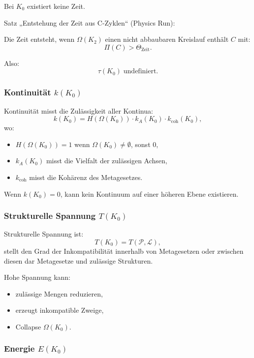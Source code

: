 Bei $K_0$ existiert keine Zeit.

Satz „Entstehung der Zeit aus C-Zyklen“ (Physics Run):

Die Zeit entsteht, wenn $\Omega(K_2)$ einen nicht abbaubaren Kreislauf enthält
$C$ mit:
\[
\Pi(C) > \Theta_{\mathrm{Zeit}}.
\]

Also:
\[
\tau(K_0) \;\text{undefiniert}.
\]

\subsubsection{Kontinuität \texorpdfstring{$k(K_0)$}{k(K_0)}}

Kontinuität misst die Zulässigkeit aller Kontinua:
\[
k(K_0) =
H(\Omega(K_0)) \cdot
k_A(K_0) \cdot
k_{\mathrm{coh}}(K_0),
\]
wo:
\begin{itemize}
    \item $H(\Omega(K_0)) = 1$ wenn $\Omega(K_0)\neq\emptyset$, sonst $0$,
    \item $k_A(K_0)$ misst die Vielfalt der zulässigen Achsen,
    \item $k_{\mathrm{coh}}$ misst die Kohärenz des Metagesetzes.
\end{itemize}

Wenn $k(K_0)=0$, kann kein Kontinuum auf einer höheren Ebene existieren.

\subsubsection{Strukturelle Spannung \texorpdfstring{$T(K_0)$}{T(K_0)}}

Strukturelle Spannung ist:
\[
T(K_0) = T(\mathcal{P}, \mathcal{L}),
\]
stellt den Grad der Inkompatibilität innerhalb von Metagesetzen oder zwischen diesen dar
Metagesetze und zulässige Strukturen.

Hohe Spannung kann:
\begin{itemize}
    \item zulässige Mengen reduzieren,
    \item erzeugt inkompatible Zweige,
    \item Collapse $\Omega(K_0)$.
\end{itemize}

\subsubsection{Energie \texorpdfstring{$E(K_0)$}{E(K_0)}}

